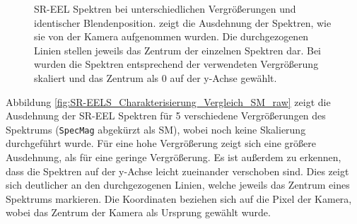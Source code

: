 \documentclass[
	paper=a4,				%
	twoside=true,			%
	BCOR=6mm,				%
	fontsize=12pt,			%
	pagesize=auto,			%
	numbers=noenddot,		%
	bibliography=totoc,		%
	draft=false
]{scrartcl}
\begin{document}
\begin{figure}
	\centering
	\caption[SR-EEL Spektren bei unterschiedlichen Vergrößerungen]{SR-EEL Spektren bei unterschiedlichen Vergrößerungen und identischer Blendenposition.  zeigt die Ausdehnung der Spektren, wie sie von der Kamera aufgenommen wurden. Die durchgezogenen Linien stellen jeweils das Zentrum der einzelnen Spektren dar. Bei  wurden die Spektren entsprechend der verwendeten Vergrößerung skaliert und das Zentrum als 0 auf der y-Achse gewählt.}
	\label{fig:SR-EELS_Charakterisierung_Vergleich_SM}
\end{figure}

Abbildung \ref{fig:SR-EELS_Charakterisierung_Vergleich_SM_raw} zeigt die Ausdehnung der SR-EEL Spektren für 5 verschiedene Vergrößerungen des Spektrums (\texttt{SpecMag} abgekürzt als SM), wobei noch keine Skalierung durchgeführt wurde. Für eine hohe Vergrößerung zeigt sich eine größere Ausdehnung, als für eine geringe Vergrößerung. Es ist außerdem zu erkennen, dass die Spektren auf der y-Achse leicht zueinander verschoben sind. Dies zeigt sich deutlicher an den durchgezogenen Linien, welche jeweils das Zentrum eines Spektrums markieren. Die Koordinaten beziehen sich auf die Pixel der Kamera, wobei das Zentrum der Kamera als Ursprung gewählt wurde.
\end{document}
